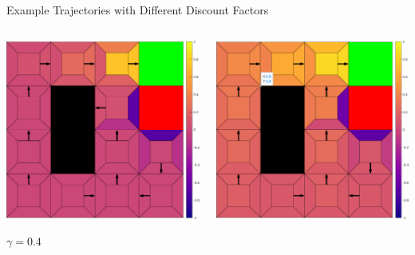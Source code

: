\documentclass[aspectratio=169]{beamer}
\begin{document}
\begin{frame}{Example Trajectories with Different Discount Factors}
  \begin{columns}
    \begin{center}
      \includegraphics[width=\textwidth]{images/ex_gam4-eps-converted-to.pdf}
      
      \textbf{$\gamma = 0.4$}
    \end{center}
    
    \begin{center}
      \includegraphics[width=\textwidth]{images/ex_gam8-eps-converted-to.pdf}
      

\end{center}
\end{columns}
\end{frame}
\end{document}

